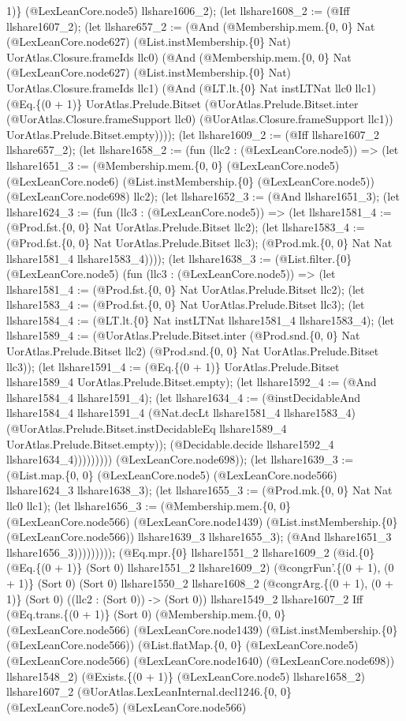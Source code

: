\documentclass[11pt]{article}
\begin{document}
1)\} (@LexLeanCore.node5) llshare1606\_2); (let llshare1608\_2 := (@Iff llshare1607\_2); (let llshare657\_2 := (@And (@Membership.mem.\{0, 0\} Nat (@LexLeanCore.node627) (@List.instMembership.\{0\} Nat) UorAtlas.Closure.frameIds llc0) (@And (@Membership.mem.\{0, 0\} Nat (@LexLeanCore.node627) (@List.instMembership.\{0\} Nat) UorAtlas.Closure.frameIds llc1) (@And (@LT.lt.\{0\} Nat instLTNat llc0 llc1) (@Eq.\{(0 + 1)\} UorAtlas.Prelude.Bitset (@UorAtlas.Prelude.Bitset.inter (@UorAtlas.Closure.frameSupport llc0) (@UorAtlas.Closure.frameSupport llc1)) UorAtlas.Prelude.Bitset.empty)))); (let llshare1609\_2 := (@Iff llshare1607\_2 llshare657\_2); (let llshare1658\_2 := (fun (llc2 : (@LexLeanCore.node5)) => (let llshare1651\_3 := (@Membership.mem.\{0, 0\} (@LexLeanCore.node5) (@LexLeanCore.node6) (@List.instMembership.\{0\} (@LexLeanCore.node5)) (@LexLeanCore.node698) llc2); (let llshare1652\_3 := (@And llshare1651\_3); (let llshare1624\_3 := (fun (llc3 : (@LexLeanCore.node5)) => (let llshare1581\_4 := (@Prod.fst.\{0, 0\} Nat UorAtlas.Prelude.Bitset llc2); (let llshare1583\_4 := (@Prod.fst.\{0, 0\} Nat UorAtlas.Prelude.Bitset llc3); (@Prod.mk.\{0, 0\} Nat Nat llshare1581\_4 llshare1583\_4)))); (let llshare1638\_3 := (@List.filter.\{0\} (@LexLeanCore.node5) (fun (llc3 : (@LexLeanCore.node5)) => (let llshare1581\_4 := (@Prod.fst.\{0, 0\} Nat UorAtlas.Prelude.Bitset llc2); (let llshare1583\_4 := (@Prod.fst.\{0, 0\} Nat UorAtlas.Prelude.Bitset llc3); (let llshare1584\_4 := (@LT.lt.\{0\} Nat instLTNat llshare1581\_4 llshare1583\_4); (let llshare1589\_4 := (@UorAtlas.Prelude.Bitset.inter (@Prod.snd.\{0, 0\} Nat UorAtlas.Prelude.Bitset llc2) (@Prod.snd.\{0, 0\} Nat UorAtlas.Prelude.Bitset llc3)); (let llshare1591\_4 := (@Eq.\{(0 + 1)\} UorAtlas.Prelude.Bitset llshare1589\_4 UorAtlas.Prelude.Bitset.empty); (let llshare1592\_4 := (@And llshare1584\_4 llshare1591\_4); (let llshare1634\_4 := (@instDecidableAnd llshare1584\_4 llshare1591\_4 (@Nat.decLt llshare1581\_4 llshare1583\_4) (@UorAtlas.Prelude.Bitset.instDecidableEq llshare1589\_4 UorAtlas.Prelude.Bitset.empty)); (@Decidable.decide llshare1592\_4 llshare1634\_4))))))))) (@LexLeanCore.node698)); (let llshare1639\_3 := (@List.map.\{0, 0\} (@LexLeanCore.node5) (@LexLeanCore.node566) llshare1624\_3 llshare1638\_3); (let llshare1655\_3 := (@Prod.mk.\{0, 0\} Nat Nat llc0 llc1); (let llshare1656\_3 := (@Membership.mem.\{0, 0\} (@LexLeanCore.node566) (@LexLeanCore.node1439) (@List.instMembership.\{0\} (@LexLeanCore.node566)) llshare1639\_3 llshare1655\_3); (@And llshare1651\_3 llshare1656\_3))))))))); (@Eq.mpr.\{0\} llshare1551\_2 llshare1609\_2 (@id.\{0\} (@Eq.\{(0 + 1)\} (Sort 0) llshare1551\_2 llshare1609\_2) (@congrFun'.\{(0 + 1), (0 + 1)\} (Sort 0) (Sort 0) llshare1550\_2 llshare1608\_2 (@congrArg.\{(0 + 1), (0 + 1)\} (Sort 0) ((llc2 : (Sort 0)) -> (Sort 0)) llshare1549\_2 llshare1607\_2 Iff (@Eq.trans.\{(0 + 1)\} (Sort 0) (@Membership.mem.\{0, 0\} (@LexLeanCore.node566) (@LexLeanCore.node1439) (@List.instMembership.\{0\} (@LexLeanCore.node566)) (@List.flatMap.\{0, 0\} (@LexLeanCore.node5) (@LexLeanCore.node566) (@LexLeanCore.node1640) (@LexLeanCore.node698)) llshare1548\_2) (@Exists.\{(0 + 1)\} (@LexLeanCore.node5) llshare1658\_2) llshare1607\_2 (@UorAtlas.LexLeanInternal.decl1246.\{0, 0\} (@LexLeanCore.node5) (@LexLeanCore.node566) 
\end{document}
